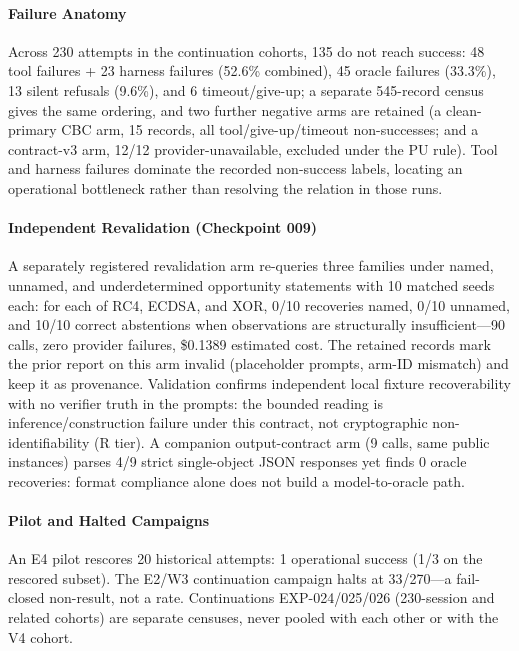 \paragraph{Failure Anatomy}\label{sec:failures}
Across 230 attempts in the continuation cohorts, 135 do not reach success:
48 tool failures + 23 harness failures (52.6\% combined), 45 oracle failures
(33.3\%), 13 silent refusals (9.6\%), and 6 timeout/give-up; a separate
545-record census gives the same ordering, and two further negative arms are
retained (a clean-primary CBC arm, 15 records, all tool/give-up/timeout
non-successes; and a contract-v3 arm, 12/12 provider-unavailable, excluded
under the PU rule). Tool and harness failures dominate the recorded
non-success labels, locating an operational bottleneck rather than resolving
the relation in those runs.

\paragraph{Independent Revalidation (Checkpoint 009)}\label{sec:revalidation}
A separately registered revalidation arm re-queries three families under
named, unnamed, and underdetermined opportunity statements with 10 matched
seeds each: for each of RC4, ECDSA, and XOR, 0/10 recoveries named, 0/10
unnamed, and 10/10 correct abstentions when observations are structurally
insufficient---90 calls, zero provider failures, \$0.1389 estimated cost.
The retained records mark the prior report on this arm invalid (placeholder
prompts, arm-ID mismatch) and keep it as provenance. Validation confirms
independent local fixture recoverability with no verifier truth in the
prompts: the bounded reading is inference/construction failure under this
contract, not cryptographic non-identifiability (R tier). A companion
output-contract arm (9 calls, same public instances) parses 4/9 strict
single-object JSON responses yet finds 0 oracle recoveries: format compliance
alone does not build a model-to-oracle path.

\paragraph{Pilot and Halted Campaigns}\label{sec:pilot}
An E4 pilot rescores 20 historical attempts: 1 operational success (1/3 on
the rescored subset). The E2/W3 continuation campaign halts at 33/270---a
fail-closed non-result, not a rate. Continuations EXP-024/025/026 (230-session
and related cohorts) are separate censuses, never pooled with each other or
with the V4 cohort.


